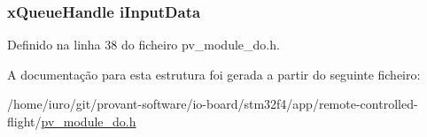 \hypertarget{structpv__interface__do_ad057767ef15274f0933ad1821fea7239}{
\subsubsection[{i\-Input\-Data}]{\setlength{\rightskip}{0pt plus 5cm}x\-Queue\-Handle i\-Input\-Data}}\label{structpv__interface__do_ad057767ef15274f0933ad1821fea7239}


Definido na linha 38 do ficheiro pv\-\_\-module\-\_\-do.\-h.



A documentação para esta estrutura foi gerada a partir do seguinte ficheiro\-:\begin{DoxyCompactItemize}
\item 
/home/iuro/git/provant-\/software/io-\/board/stm32f4/app/remote-\/controlled-\/flight/\hyperlink{pv__module__do_8h}{pv\-\_\-module\-\_\-do.\-h}\end{DoxyCompactItemize}

